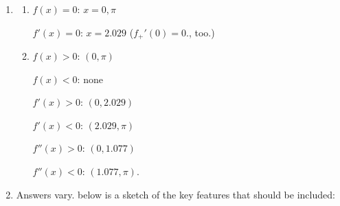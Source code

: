 \begin{enumerate}
\begin{enumerate}
\smallskip



\end{enumerate}

\newpage

\item \begin{enumerate}  \item

\begin{multicols}{2}

 $f(x) = 0$:  $x = 0, \pi$
 
  $f'(x) = 0$: $x = 2.029$ ($f_{+}'(0) = 0$.,  too.)

\end{multicols}

\smallskip

\item  \begin{multicols}{2}

 $f(x) > 0$: $(0, \pi)$
 
  $f(x) < 0$: none

\end{multicols}

\smallskip

\begin{multicols}{2}

 $f'(x) > 0$: $(0, 2.029)$
 
  $f'(x) < 0$: $(2.029, \pi)$

\end{multicols}

\smallskip

\begin{multicols}{2}

 $f''(x) > 0$: $(0, 1.077)$
 
  $f''(x) < 0$: $(1.077, \pi)$.

\end{multicols}

\end{enumerate}

\item Answers vary.  below is a sketch of the key features that should be included:


\begin{center}


\end{center}
\end{enumerate}
